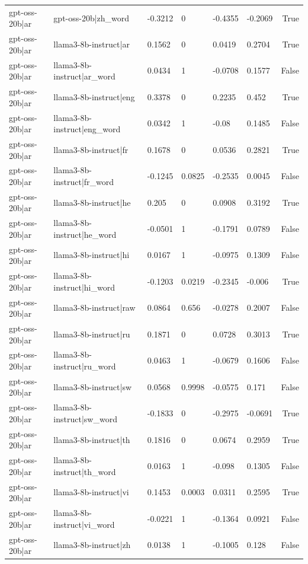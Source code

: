 \begin{table}
\begin{tabular}{llllllr}
gpt-oss-20b|ar & gpt-oss-20b|zh_word & -0.3212 & 0 & -0.4355 & -0.2069 & True \\
gpt-oss-20b|ar & llama3-8b-instruct|ar & 0.1562 & 0 & 0.0419 & 0.2704 & True \\
gpt-oss-20b|ar & llama3-8b-instruct|ar_word & 0.0434 & 1 & -0.0708 & 0.1577 & False \\
gpt-oss-20b|ar & llama3-8b-instruct|eng & 0.3378 & 0 & 0.2235 & 0.452 & True \\
gpt-oss-20b|ar & llama3-8b-instruct|eng_word & 0.0342 & 1 & -0.08 & 0.1485 & False \\
gpt-oss-20b|ar & llama3-8b-instruct|fr & 0.1678 & 0 & 0.0536 & 0.2821 & True \\
gpt-oss-20b|ar & llama3-8b-instruct|fr_word & -0.1245 & 0.0825 & -0.2535 & 0.0045 & False \\
gpt-oss-20b|ar & llama3-8b-instruct|he & 0.205 & 0 & 0.0908 & 0.3192 & True \\
gpt-oss-20b|ar & llama3-8b-instruct|he_word & -0.0501 & 1 & -0.1791 & 0.0789 & False \\
gpt-oss-20b|ar & llama3-8b-instruct|hi & 0.0167 & 1 & -0.0975 & 0.1309 & False \\
gpt-oss-20b|ar & llama3-8b-instruct|hi_word & -0.1203 & 0.0219 & -0.2345 & -0.006 & True \\
gpt-oss-20b|ar & llama3-8b-instruct|raw & 0.0864 & 0.656 & -0.0278 & 0.2007 & False \\
gpt-oss-20b|ar & llama3-8b-instruct|ru & 0.1871 & 0 & 0.0728 & 0.3013 & True \\
gpt-oss-20b|ar & llama3-8b-instruct|ru_word & 0.0463 & 1 & -0.0679 & 0.1606 & False \\
gpt-oss-20b|ar & llama3-8b-instruct|sw & 0.0568 & 0.9998 & -0.0575 & 0.171 & False \\
gpt-oss-20b|ar & llama3-8b-instruct|sw_word & -0.1833 & 0 & -0.2975 & -0.0691 & True \\
gpt-oss-20b|ar & llama3-8b-instruct|th & 0.1816 & 0 & 0.0674 & 0.2959 & True \\
gpt-oss-20b|ar & llama3-8b-instruct|th_word & 0.0163 & 1 & -0.098 & 0.1305 & False \\
gpt-oss-20b|ar & llama3-8b-instruct|vi & 0.1453 & 0.0003 & 0.0311 & 0.2595 & True \\
gpt-oss-20b|ar & llama3-8b-instruct|vi_word & -0.0221 & 1 & -0.1364 & 0.0921 & False \\
gpt-oss-20b|ar & llama3-8b-instruct|zh & 0.0138 & 1 & -0.1005 & 0.128 & False \\

\end{tabular}
\end{table}
